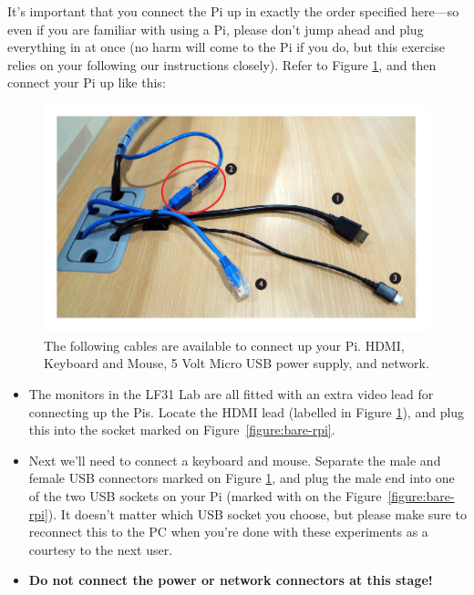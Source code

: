 It's important that you connect the Pi up in exactly the order specified here---so even if you are familiar with using a Pi, please don't jump ahead and plug everything in at once (no harm will come to the Pi if you do, but this exercise relies on your following our instructions closely). Refer to Figure \ref{figure:cables}, and then connect your Pi up like this:

\begin{figure}
\centerline{\includegraphics[width=13cm]{images/cables}}
\caption{The following cables are available to connect up your Pi. \protect{} HDMI, \protect{} Keyboard and Mouse, \protect{} 5 Volt Micro USB power supply, and \protect{} network.}\label{figure:cables}
\end{figure}


\begin{itemize}
\item The monitors in the LF31 Lab are all fitted with an extra video lead for connecting up the Pis. Locate the HDMI lead (labelled \protect{} in Figure \ref{figure:cables}), and plug this into the socket marked  on Figure~\ref{figure:bare-rpi}. 
\item Next we'll need to connect a keyboard and mouse. Separate the male and female USB connectors marked \protect{} on Figure \ref{figure:cables}, and plug the male end into one of the two USB sockets on your Pi (marked with \protect{} on the Figure~\ref{figure:bare-rpi}). It doesn't matter which USB socket you choose, but please make sure to reconnect this to the PC when you're done with these experiments as a courtesy to the next user. 
\item \textbf{Do not connect the power or network connectors at this stage!}
\end{itemize}


